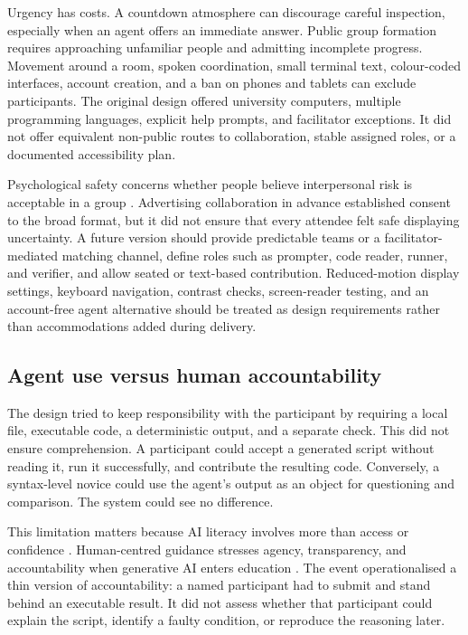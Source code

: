 \documentclass[11pt,a4paper]{article}
\begin{document}
Urgency has costs. A countdown atmosphere can discourage careful inspection, especially when an agent offers an immediate answer. Public group formation requires approaching unfamiliar people and admitting incomplete progress. Movement around a room, spoken coordination, small terminal text, colour-coded interfaces, account creation, and a ban on phones and tablets can exclude participants. The original design offered university computers, multiple programming languages, explicit help prompts, and facilitator exceptions. It did not offer equivalent non-public routes to collaboration, stable assigned roles, or a documented accessibility plan.

Psychological safety concerns whether people believe interpersonal risk is acceptable in a group \citep{edmondson1999safety}. Advertising collaboration in advance established consent to the broad format, but it did not ensure that every attendee felt safe displaying uncertainty. A future version should provide predictable teams or a facilitator-mediated matching channel, define roles such as prompter, code reader, runner, and verifier, and allow seated or text-based contribution. Reduced-motion display settings, keyboard navigation, contrast checks, screen-reader testing, and an account-free agent alternative should be treated as design requirements rather than accommodations added during delivery.

\subsection{Agent use versus human accountability}

The design tried to keep responsibility with the participant by requiring a local file, executable code, a deterministic output, and a separate check. This did not ensure comprehension. A participant could accept a generated script without reading it, run it successfully, and contribute the resulting code. Conversely, a syntax-level novice could use the agent's output as an object for questioning and comparison. The system could see no difference.

This limitation matters because AI literacy involves more than access or confidence \citep{ng2021literacy}. Human-centred guidance stresses agency, transparency, and accountability when generative AI enters education \citep{unesco2023guidance}. The event operationalised a thin version of accountability: a named participant had to submit and stand behind an executable result. It did not assess whether that participant could explain the script, identify a faulty condition, or reproduce the reasoning later.
\end{document}
